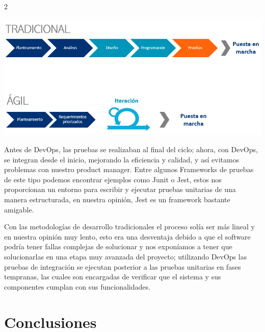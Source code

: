 \documentclass[12pt,spanish,Letterpaper,openany]{book}
\begin{document}
\begin {multicols}{2}
\begin {flushleft}
\noindent\begin{minipage}[c]{\columnwidth}

\begin{center}\includegraphics[width=1\linewidth]{imagenes_articulos/sp08_02} \end{center}

\end{minipage}
\end {flushleft}

Antes de DevOps, las pruebas se realizaban al final del ciclo; ahora, con DevOps, se integran desde el inicio, mejorando la eficiencia y calidad, y así evitamos problemas con nuestro product manager. Entre algunos Frameworks de pruebas de este tipo podemos encontrar ejemplos como Junit o Jest, estos nos proporcionan un entorno para escribir y ejecutar pruebas unitarias de una manera estructurada, en nuestra opinión, Jest es un framework bastante amigable.

Con las metodologías de desarrollo tradicionales el proceso solía ser más lineal y en nuestra opinión muy lento, esto era una desventaja debido a que el software podría tener fallas complejas de solucionar y nos exponíamos a tener que solucionarlas en una etapa muy avanzada del proyecto; utilizando DevOps las pruebas de integración se ejecutan posterior a las pruebas unitarias en fases tempranas, las cuales son encargadas de verificar que el sistema y sus componentes cumplan con sus funcionalidades.

\bigskip
\bigskip
\bigskip

\hypertarget{conclusiones-6}{%
\section{Conclusiones}\label{conclusiones-6}}


\end{multicols}
\end{document}
